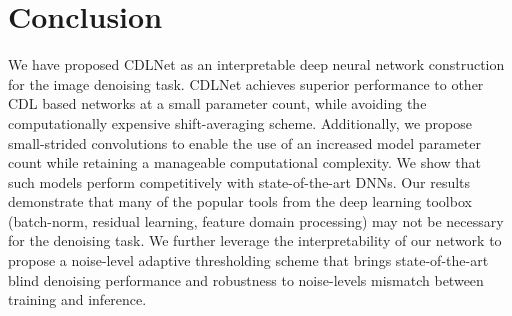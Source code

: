 \documentclass[conference]{IEEEtran}
\newcommand{\soa}{state-of-the-art }
\begin{document}
\begin{table}[ht]
\centering
\caption{Effect of noise estimation algorithm on performance of the noise adaptive model Big-CDLNet-A.}
\label{table:noise_est}
\end{table}

\section{Conclusion}
We have proposed CDLNet as an interpretable deep neural network construction for the image denoising task. CDLNet achieves superior performance to other CDL based networks at a small parameter count, while avoiding the computationally expensive shift-averaging scheme. Additionally, we propose small-strided convolutions to enable the use of an increased model parameter count while retaining a manageable computational complexity. We show that such models perform competitively with \soa DNNs. Our results demonstrate that many of the popular tools from the deep learning toolbox (batch-norm, residual learning, feature domain processing) may not be necessary for the denoising task. We further leverage the interpretability of our network to propose a noise-level adaptive thresholding scheme that brings \soa blind denoising performance and robustness to noise-levels mismatch between training and inference.


 
\end{document}
